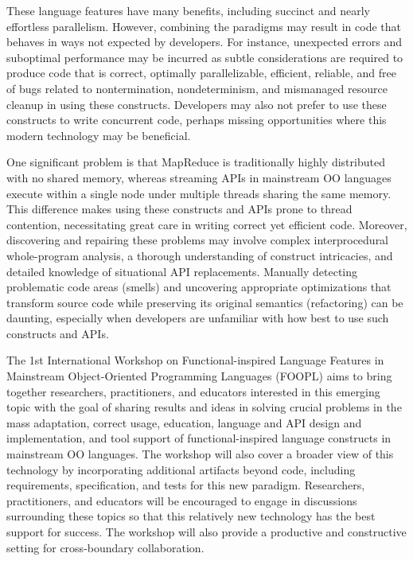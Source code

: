 \documentclass[10pt, conference]{IEEEtran}
\begin{document}
These language features have many benefits, including succinct and nearly effortless
parallelism. However, combining the paradigms may result in code that behaves in ways not expected by developers. For instance, unexpected errors and suboptimal performance may be incurred as subtle considerations are required to produce code that is correct, optimally parallelizable, efficient, reliable, and free of bugs related to nontermination, nondeterminism, and mismanaged resource cleanup in using these constructs. Developers may also not prefer to use these constructs to write concurrent code, perhaps missing opportunities where this modern technology may be beneficial.

One significant problem is that MapReduce is traditionally highly distributed with no shared memory, whereas streaming APIs in mainstream OO languages execute within a single node under multiple threads sharing the same memory. This difference makes using these constructs and APIs prone to 
thread contention, necessitating great care in writing correct yet efficient code. Moreover, discovering and repairing these problems may involve complex interprocedural whole-program analysis, a thorough understanding of construct intricacies, and detailed knowledge of situational API replacements. Manually detecting problematic code areas (smells) and uncovering appropriate optimizations that transform source code while preserving its original semantics (refactoring) can be daunting, especially
when developers are unfamiliar with how best to use such constructs and APIs.

The 1st International Workshop on Functional-inspired Language Features in Mainstream Object-Oriented Programming Languages (FOOPL) aims to bring together researchers, practitioners, and educators interested in this emerging topic with the goal of sharing results and ideas in solving crucial problems in the mass adaptation, correct usage, education, language and API design and implementation, and tool support of functional-inspired language constructs in mainstream OO languages. The workshop will also cover a broader view of this technology by incorporating additional artifacts beyond code, including requirements, specification, and tests for this new paradigm. Researchers, practitioners, and educators will be encouraged to engage in
discussions surrounding these topics so that this relatively new technology has the best support for success. The workshop will also provide a productive and constructive setting for cross-boundary collaboration.
\end{document}
